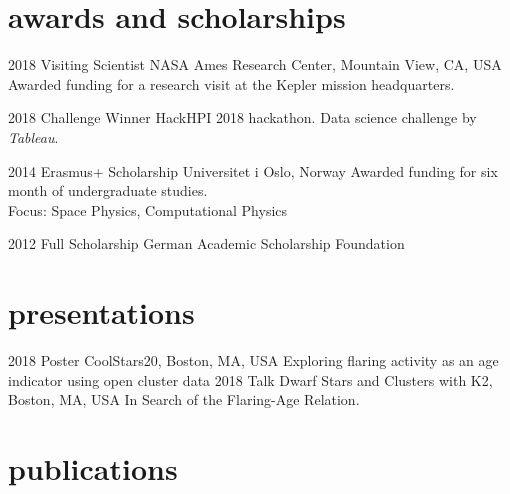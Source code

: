 \documentclass[]{k-cv} %
\begin{document}
\section{awards and scholarships}

\begin{entrylist}
\entry
{2018}
{Visiting Scientist}
{NASA Ames Research Center, Mountain View, CA, USA}
{Awarded funding for a research visit at the Kepler mission headquarters.}

\entry
{2018}
{Challenge Winner}
{HackHPI 2018 hackathon.}
{Data science challenge by \emph{Tableau}.}

\entry
{2014}
{Erasmus+ Scholarship}
{Universitet i Oslo, Norway}
{Awarded funding for six month of undergraduate studies.\\
Focus: Space Physics, Computational Physics}

\entry
{2012 }
{Full Scholarship}
{German Academic Scholarship Foundation}


\end{entrylist}

\clearpage



\section{presentations}

\begin{entrylist}
\entry
{2018}
{Poster}
{CoolStars20, Boston, MA, USA}
{Exploring flaring activity as an age indicator using open cluster data}
\entry
{2018}
{Talk}
{Dwarf Stars and Clusters with K2, Boston, MA, USA}
{In Search of the Flaring-Age Relation.}
\end{entrylist}


\section{publications}
\end{document}

